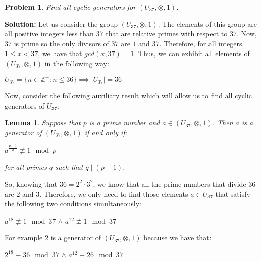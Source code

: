 \documentclass[a4paper,openany,11pt]{book}
\newtheorem{Lemma}{Lemma}
\newtheorem{Prob}{Problem}
\begin{document}
	
	\begin{center}
	\end{center}

\begin{Prob}
	Find all cyclic generators for $(U_{37}, \otimes, 1)$.
\end{Prob}

\textbf{Solution:} Let us consider the group $(U_{37}, \otimes, 1)$. The elements of this group are all positive integers less than $37$ that are relative primes with respect to $37$. Now, $37$ is prime so the only divisors of $37$ are $1$ and $37$. Therefore, for all integers $1 \leq x < 37$, we have that $gcd(x,37) = 1$. Thus, we can exhibit all elements of $(U_{37}, \otimes, 1)$ in the following way:

\begin{center}
	$U_{37} = \lbrace n \in \mathbb{Z}^{+} : n \leq 36 \rbrace \implies \left|U_{37}\right| = 36$
\end{center} 

Now, consider the following auxiliary result which will allow us to find all cyclic generators of $U_{37}$:

\begin{Lemma}
	Suppose that $p$ is a prime number and $a \in (U_{37},\otimes, 1)$. Then $a$ is a generator of $(U_{37},\otimes, 1)$ if and only if:
	
	\begin{center}
		$a^{\frac{p-1}{q}} \not \equiv 1 \mod p$
	\end{center}

	for all primes $q$ such that $q \mid (p-1)$.
\end{Lemma}

So, knowing that $36 = 2^{2}\cdot3^{2}$, we know that all the prime numbers that divide $36$ are $2$ and $3$. Therefore, we only need to find those elements $a \in 
U_{37}$ that satisfy the following two conditions simultaneously:

\begin{center}
	$a^{18} \not \equiv 1 \mod 37$ \hspace{0.1cm} $\wedge$ \hspace{0.1cm} $a^{12} \not \equiv 1 \mod 37$
\end{center}

For example $2$ is a generator of $(U_{37},\otimes, 1)$ because we have that:

\begin{center}
	$2^{18} \equiv 36 \mod 37$ \hspace{0.1cm} $\wedge$ \hspace{0.1cm} $a^{12} \equiv 26 \mod 37$
\end{center}
\end{document}
